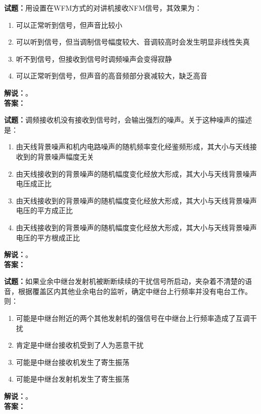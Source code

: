 \documentclass{ctexbook}
\begin{document}
\vspace{\baselineskip}

\noindent\textbf{试题：}用设置在WFM方式的对讲机接收NFM信号，其效果为：
\begin{enumerate}[leftmargin=3em]
  \item 可以正常听到信号，但声音比较小
  \item 可以听到信号，但当调制信号幅度较大、音调较高时会发生明显非线性失真
  \item 听不到信号，但接收到信号时调频噪声会变得寂静
  \item 可以正常听到信号，但声音的高音频部分衰减较大，缺乏高音
\end{enumerate}
\noindent\textbf{解说：}\textbf{}。\\\noindent\textbf{答案：}

\vspace{\baselineskip}

\noindent\textbf{试题：}调频接收机没有接收到信号时，会输出强烈的噪声。关于这种噪声的描述是：
\begin{enumerate}[leftmargin=3em]
  \item 由天线背景噪声和机内电路噪声的随机频率变化经鉴频形成，其大小与天线接收到的背景噪声幅度无关
  \item 由天线接收到的背景噪声的随机幅度变化经放大形成，其大小与天线背景噪声电压成正比
  \item 由天线接收到的背景噪声的随机幅度变化经放大形成，其大小与天线背景噪声电压的平方成正比
  \item 由天线接收到的背景噪声的随机幅度变化经放大形成，其大小与天线背景噪声电压的平方根成正比
\end{enumerate}
\noindent\textbf{解说：}\textbf{}。\\\noindent\textbf{答案：}

\vspace{\baselineskip}

\noindent\textbf{试题：}如果业余中继台发射机被断断续续的干扰信号所启动，夹杂着不清楚的语音，根据覆盖区内其他业余电台的监听，确定中继台上行频率并没有电台工作。则：
\begin{enumerate}[leftmargin=3em]
  \item 可能是中继台附近的两个其他发射机的强信号在中继台上行频率造成了互调干扰
  \item 肯定是中继台接收机受到了人为恶意干扰
  \item 可能是中继台接收机发生了寄生振荡
  \item 可能是中继台发射机发生了寄生振荡
\end{enumerate}
\noindent\textbf{解说：}\textbf{}。\\\noindent\textbf{答案：}
\end{document}
